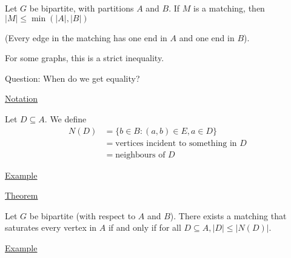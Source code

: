 \documentclass{article}
\begin{document}
Let $G$ be bipartite, with partitions $A$ and $B$. If $M$ is a matching, then $|M| \le \min(|A|,|B|)$

(Every edge in the matching has one end in $A$ and one end in $B$). 

For some graphs, this is a strict inequality. 

Question: When do we get equality?

\underline{Notation}

Let $D \subseteq A$. We define
\begin{align*}
    N(D) &= \{b \in B: (a,b) \in E, a \in D \} \\
    &= \text{vertices incident to something in $D$} \\ 
    &= \text{neighbours of $D$}
\end{align*}

\underline{Example}

\begin{center}
\end{center}


\underline{Theorem}

Let $G$ be bipartite (with respect to $A$ and $B$). There exists a matching that saturates every vertex in $A$ if and only if for all $D \subseteq A, |D| \le |N(D)|$.

\underline{Example}
\end{document}
